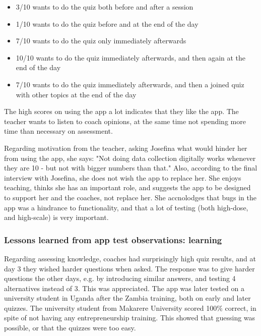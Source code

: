 


    \begin{itemize}
    \item 3/10 wants to do the quiz both before and after a session
    \item 1/10 wants to do the quiz before and at the end of the day
    \item 7/10 wants to do the quiz only immediately afterwards
    \item 10/10 wants to do the quiz immediately afterwards, and then again at the end of the day
    \item 7/10 wants to do the quiz immediately afterwards, and then a joined quiz with other topics at the end of the day
    \end{itemize}

    The high scores on using the app a lot indicates that they like the app. The teacher wants to listen to coach opinions, at the same time not spending more time than necessary on assessment.

Regarding motivation from the teacher, asking Josefina what would hinder her from using the app, she says: "Not doing data collection digitally works whenever they are 10 - but not with bigger numbers than that." Also, according to the final interview with Josefina, she does not wish the app to replace her. She enjoys teaching, thinks she has an important role, and suggests the app to be designed to support her and the coaches, not replace her. She accnolodges that bugs in the app was a hindrance to functionality, and that a lot of testing (both high-dose, and high-scale) is very important.

\subsubsection{Lessons learned from app test observations: learning}
Regarding assessing knowledge, coaches had surprisingly high quiz results, and at day 3 they wished harder questions when asked. The response was to give harder questions the other days, e.g. by introducing similar answers, and testing 4 alternatives instead of 3. This was appreciated. The app was later tested on a university student in Uganda after the Zambia training, both on early and later quizzes. The university student from Makarere University scored 100\% correct, in spite of not having any entrepreneurship training. This showed that guessing was possible, or that the quizzes were too easy.

